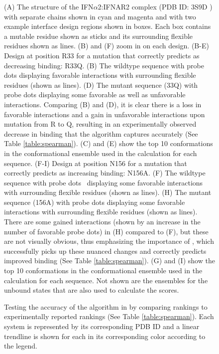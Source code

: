 \begin{figure}
 \caption{(A) The structure of the IFN$\alpha$2:IFNAR2 complex (PDB ID: 3S9D \cite{pdb3s9d}) with separate chains shown in cyan and magenta and with two example interface design regions shown in boxes. Each box contains a mutable residue shown as sticks and its surrounding flexible residues shown as lines. (B) and (F) zoom in on each design. (B-E) Design at position R33 for a mutation that \osprey correctly predicts as decreasing binding: R33Q. (B) The wildtype sequence with probe dots \cite{Probe,PIV} displaying favorable interactions with surrounding flexible residues (shown as lines). (D) The mutant sequence (33Q) with probe dots displaying some favorable as well as unfavorable interactions. Comparing (B) and (D), it is clear there is a loss in favorable interactions and a gain in unfavorable interactions upon mutation from R to Q, resulting in an experimentally observed decrease in binding that the \ks algorithm captures accurately (See Table \ref{table:spearman}). (C) and (E) show the top 10 conformations in the conformational ensemble used in the \ks calculation for each sequence. (F-I) Design at position N156 for a mutation that \osprey correctly predicts as increasing binding: N156A. (F) The wildtype sequence with probe dots~\cite{Probe,PIV} displaying some favorable interactions with surrounding flexible residues (shown as lines). (H) The mutant sequence (156A) with probe dots displaying some favorable interactions with surrounding flexible residues (shown as lines). There are some gained interactions (shown by an increase in the number of favorable probe dots) in (H) compared to (F), but these are not visually obvious, thus emphasizing the importance of \ks, which successfully picks up these nuanced changes and correctly predicts improved binding (See Table \ref{table:spearman}). (G) and (I) show the top 10 conformations in the conformational ensemble used in the \ks calculation for each sequence. Not shown are the ensembles for the unbound states that are also used to calculate the \ks scores.}
\label{fig:designs}
\end{figure}

\begin{figure}
\caption{Testing the accuracy of the \ks algorithm in  by comparing \ks rankings to experimentally reported rankings (See Table \ref{table:spearman}). Each system is represented by its corresponding PDB ID and a linear trendline is shown for each in its corresponding color according to the legend.}
\label{fig:rankings}
\end{figure}


